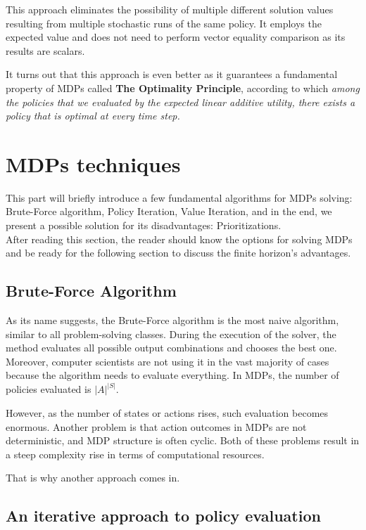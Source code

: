 This approach eliminates the possibility of multiple different solution values resulting from multiple stochastic runs of the same policy. It employs the expected value and does not need to perform vector equality comparison as its results are scalars.

It turns out that this approach is even better as it guarantees a fundamental property of MDPs called \textbf{The Optimality Principle}, according to which \textit{among the policies that we evaluated by the expected linear additive utility, there exists a policy that is optimal at every time step.}

\section{MDPs techniques}

This part will briefly introduce a few fundamental algorithms for MDPs solving: Brute-Force algorithm, Policy Iteration, Value Iteration, and in the end, we present a possible solution for its disadvantages: Prioritizations. \\
After reading this section, the reader should know the options for solving MDPs and be ready for the following section to discuss the finite horizon's advantages.

\subsection{Brute-Force Algorithm}
As its name suggests, the Brute-Force algorithm is the most naive algorithm, similar to all problem-solving classes. During the execution of the solver, the method evaluates all possible output combinations and chooses the best one.
Moreover, computer scientists are not using it in the vast majority of cases because the algorithm needs to evaluate everything. In MDPs, the number of policies evaluated is $|A|^{|S|}$.

However, as the number of states or actions rises, such evaluation becomes enormous. Another problem is that action outcomes in MDPs are not deterministic, and MDP structure is often cyclic. Both of these problems result in a steep complexity rise in terms of computational resources.

That is why another approach comes in.

\subsection{An iterative approach to policy evaluation}

